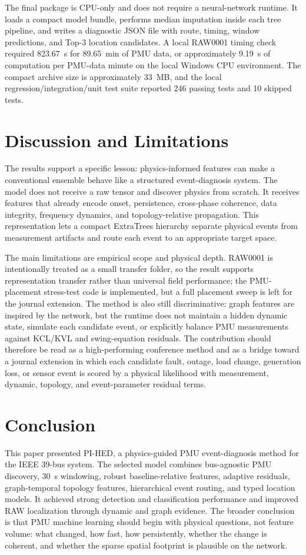 \documentclass[conference]{IEEEtran}
\begin{document}
The final package is CPU-only and does not require a neural-network runtime. It loads a compact model bundle, performs median imputation inside each tree pipeline, and writes a diagnostic JSON file with route, timing, window predictions, and Top-3 location candidates. A local RAW0001 timing check required 823.67~s for 89.65~min of PMU data, or approximately 9.19~s of computation per PMU-data minute on the local Windows CPU environment. The compact archive size is approximately 33~MB, and the local regression/integration/unit test suite reported 246 passing tests and 10 skipped tests.

\section{Discussion and Limitations}
\label{sec:discussion}
The results support a specific lesson: physics-informed features can make a conventional ensemble behave like a structured event-diagnosis system. The model does not receive a raw tensor and discover physics from scratch. It receives features that already encode onset, persistence, cross-phase coherence, data integrity, frequency dynamics, and topology-relative propagation. This representation lets a compact ExtraTrees hierarchy separate physical events from measurement artifacts and route each event to an appropriate target space.

The main limitations are empirical scope and physical depth. RAW0001 is intentionally treated as a small transfer folder, so the result supports representation transfer rather than universal field performance; the PMU-placement stress-test code is implemented, but a full placement sweep is left for the journal extension. The method is also still discriminative: graph features are inspired by the network, but the runtime does not maintain a hidden dynamic state, simulate each candidate event, or explicitly balance PMU measurements against KCL/KVL and swing-equation residuals. The contribution should therefore be read as a high-performing conference method and as a bridge toward a journal extension in which each candidate fault, outage, load change, generation loss, or sensor event is scored by a physical likelihood with measurement, dynamic, topology, and event-parameter residual terms.

\section{Conclusion}
This paper presented PI-HED, a physics-guided PMU event-diagnosis method for the IEEE 39-bus system. The selected model combines bus-agnostic PMU discovery, 30~s windowing, robust baseline-relative features, adaptive residuals, graph-temporal topology features, hierarchical event routing, and typed location models. It achieved strong detection and classification performance and improved RAW localization through dynamic and graph evidence. The broader conclusion is that PMU machine learning should begin with physical questions, not feature volume: what changed, how fast, how persistently, whether the change is coherent, and whether the sparse spatial footprint is plausible on the network.
\end{document}
